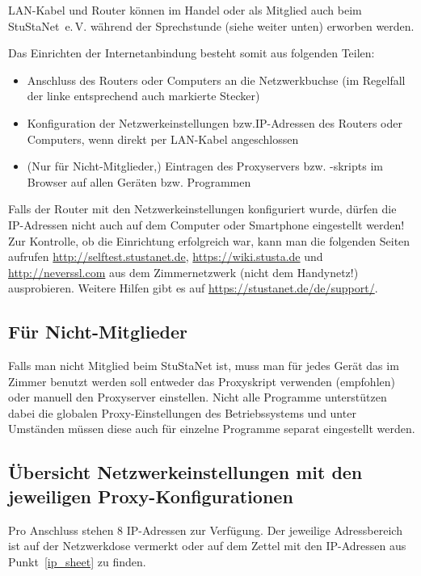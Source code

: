 \documentclass[a4paper,12pt]{scrartcl}
\makeatletter
\newcommand{\StuStaNet}{StuStaNet~e.\,V.\@}
\makeatother
\begin{document}
LAN-Kabel und Router können im Handel oder als Mitglied auch beim \StuStaNet{} während der Sprechstunde (siehe weiter unten) erworben werden.

Das Einrichten der Internetanbindung besteht somit aus folgenden Teilen:
\begin{itemize}
	\item Anschluss des Routers oder Computers an die Netzwerkbuchse (im Regelfall der linke entsprechend auch markierte Stecker)
	\item Konfiguration der Netzwerkeinstellungen bzw.\@ IP-Adressen des Routers oder Computers, wenn direkt per LAN-Kabel angeschlossen
	\item (Nur für Nicht-Mitglieder,) Eintragen des Proxyservers bzw. -skripts im Browser auf allen Geräten bzw. Programmen
\end{itemize}
Falls der Router mit den Netzwerkeinstellungen konfiguriert wurde, dürfen die IP-Adressen nicht auch auf dem Computer oder Smartphone eingestellt werden!
Zur Kontrolle, ob die Einrichtung erfolgreich war, kann man die folgenden Seiten aufrufen \mbox{\url{http://selftest.stustanet.de}}, \mbox{\url{https://wiki.stusta.de}} und \mbox{\url{http://neverssl.com}} aus dem Zimmernetzwerk (nicht dem Handynetz!) ausprobieren.
Weitere Hilfen gibt es auf \mbox{\url{https://stustanet.de/de/support/}}.

\subsection{Für Nicht-Mitglieder}

Falls man nicht Mitglied beim StuStaNet ist, muss man für jedes Gerät das im Zimmer benutzt werden soll entweder das Proxyskript verwenden (empfohlen) oder manuell den Proxyserver einstellen.
Nicht alle Programme unterstützen dabei die globalen Proxy-Einstellungen des Betriebssystems und unter Umständen müssen diese auch für einzelne Programme separat eingestellt werden.

\newpage
\subsection{Übersicht Netzwerkeinstellungen mit den jeweiligen Proxy-Konfigurationen}
\label{subsec_settings}

Pro Anschluss stehen 8 IP-Adressen zur Verfügung. Der jeweilige Adressbereich ist auf der Netzwerkdose vermerkt oder auf dem Zettel mit den IP-Adressen aus Punkt~\ref{ip_sheet} zu finden. %
\end{document}
